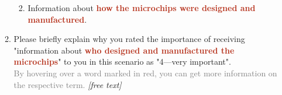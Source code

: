 \begin{enumerate}
\begin{enumerate}
\begin{enumerate}
                \item \label{xhw_study::question::v0_information_how_manucatured}
                    Information about \textbf{\textcolor[HTML]{B6321C}{how the microchips were designed and manufactured}}.
            \end{enumerate}
            \item \label{xhw_study::question::v0_information_open}
                Please briefly explain why you rated the importance of receiving "information about \textbf{\textcolor[HTML]{B6321C}{who designed and manufactured the microchips}}" to you in this scenario as "4---very important".\\
                \textcolor{gray}{\infosymbol By hovering over a word marked in red, you can get more information on the respective term.} \textit{[free text]}
        \end{enumerate}
    \setcounter{qcounter}{\value{enumi}}
\end{enumerate}

